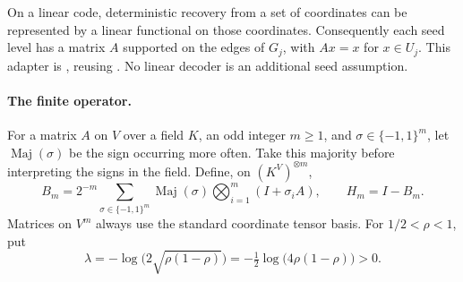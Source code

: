 On a linear code, deterministic recovery from a set of coordinates
can be represented by a linear functional on those coordinates.
Consequently each seed level has a matrix $A$ supported on the edges
of $G_j$, with $Ax=x$ for $x\in U_j$. This adapter is
, reusing
.
No linear decoder is an additional seed assumption.

\paragraph{The finite operator.}
For a matrix $A$ on $V$ over a field $K$, an odd integer $m\ge1$, and
$\sigma\in\{-1,1\}^m$, let $\operatorname{Maj}(\sigma)$ be the sign
occurring more often. Take this majority before interpreting the signs
in the field. Define, on $(K^V)^{\otimes m}$,
\begin{equation}\label{eq:majority}
 B_m=2^{-m}\sum_{\sigma\in\{-1,1\}^m}
       \operatorname{Maj}(\sigma)
       \bigotimes_{i=1}^m(I+\sigma_i A),
 \qquad H_m=I-B_m.
\end{equation}
Matrices on $V^m$ always use the standard coordinate tensor basis.
For $1/2<\rho<1$, put
\begin{equation}\label{eq:decay}
 \lambda=-\log\bigl(2\sqrt{\rho(1-\rho)}\bigr)
         =-\tfrac12\log\bigl(4\rho(1-\rho)\bigr)>0.
\end{equation}

